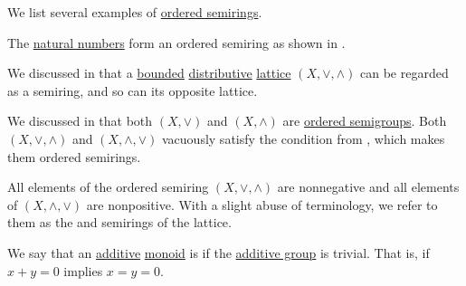 \begin{example}\label{ex:def:ordered_semiring}
  We list several examples of \hyperref[def:ordered_semiring]{ordered semirings}.

  \begin{thmenum}
     The \hyperref[def:natural_numbers]{natural numbers} form an ordered semiring as shown in .

     We discussed in  that a \hyperref[def:extremal_points/bounds]{bounded} \hyperref[def:distributive_lattice]{distributive} \hyperref[def:lattice]{lattice} \( (X, \vee, \wedge) \) can be regarded as a semiring, and so can its opposite lattice.

    We discussed in  that both \( (X, \vee) \) and \( (X, \wedge) \) are \hyperref[def:ordered_semigroup]{ordered semigroups}. Both \( (X, \vee, \wedge) \) and \( (X, \wedge, \vee) \) vacuously satisfy the condition from , which makes them ordered semirings.

    All elements of the ordered semiring \( (X, \vee, \wedge) \) are nonnegative and all elements of \( (X, \wedge, \vee) \) are nonpositive. With a slight abuse of terminology, we refer to them as the  and  semirings of the lattice.
  \end{thmenum}
\end{example}

\begin{definition}\label{def:zerosumfree}
  We say that an \hyperref[con:additive_semigroup]{additive} \hyperref[def:monoid]{monoid} is  if the \hyperref[thm:invertible_submonoid_is_group]{additive group} is trivial. That is, if \( x + y = 0 \) implies \( x = y = 0 \).
\end{definition}

